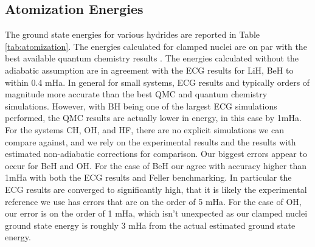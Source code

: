 \documentclass[pra,superscriptaddress,groupedaddress,twocolumn]{revtex4}
\begin{document}
\subsection{Atomization Energies}
The ground state energies for various hydrides are reported in Table \ref{tab:atomization}. The energies calculated for clamped nuclei are on par with the best available quantum chemistry results \cite{Adamowicz_LiH,Koput_BeH,Miliordos_BH}. The energies calculated without the adiabatic assumption are in agreement with the ECG results for LiH, BeH to within 0.4 mHa.   In general for small systems, ECG results and typically orders of magnitude more accurate than the best QMC and quantum chemistry simulations.  However, with BH being one of the largest ECG simulations performed, the QMC results are actually lower in energy, in this case by 1mHa.  For the systems CH, OH, and HF, there are no explicit simulations we can compare against, and we rely on the experimental results and the results with estimated non-adiabatic corrections for comparison.  Our biggest errors appear to occur for BeH and OH.   For the case of BeH our agree with accuracy higher than 1mHa with both the ECG results and Feller benchmarking.  In particular the ECG results are converged to significantly high, that it is likely the experimental reference we use has errors that are on the order of 5 mHa.   For the case of OH, our error is on the order of 1 mHa, which isn't unexpected as our clamped nuclei ground state energy is roughly 3 mHa from the actual estimated ground state energy.%
 
\end{document}
